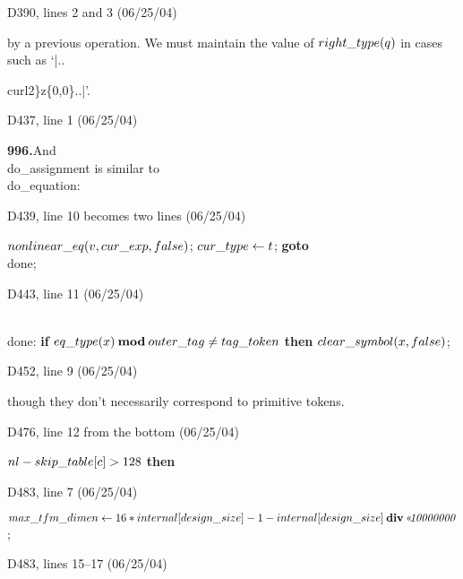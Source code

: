 {{\bugonpage D390, lines 2 and 3 (06/25/04)

\noindent
by a previous operation. We must maintain
the value of $\\{right\_type}(q)$ in cases such as\break
`|..\\{curl2\}z\{0,0\}..|'.

\bugonpage D437, line 1 (06/25/04)

\noindent
{\bf996.\quad}And \\{do\_assignment} is similar to \\{do\_equation}:

\bugonpage D439, line 10 becomes two lines (06/25/04)

\ninepoint\noindent
{} $\\{nonlinear\_eq}(v,\\{cur\_exp},\\{false})$;
  $\\{cur\_type}\gets t$;
  {\bf goto} \\{done};

\bugonpage D443, line 11 (06/25/04)

\ninepoint\noindent
\\{done}: {\bf if\/} $\\{eq\_type}(x)\mathbin{\hbox{\bf mod}}\\{outer\_tag}
  \ne\\{tag\_token}$ {\bf then}
  $\\{clear\_symbol}(x,\\{false})$;

\bugonpage D452, line 9 (06/25/04)

\noindent
though they don't necessarily correspond to primitive tokens.

\bugonpage D476, line 12 from the bottom (06/25/04)

\ninepoint\noindent
{} $\\{nl}-\\{skip\_table}[c]>128$ {\bf then}

\bugonpage D483, line 7 (06/25/04)

\ninepoint\noindent
\quad$\\{max\_tfm\_dimen}\gets16\ast\\{internal}[\\{design\_size}]-1
  -\\{internal}[\\{design\_size}]\mathbin{\hbox{\bf div}}\Oct{10000000}$;

\bugonpage D483, lines 15--17 (06/25/04)

}}}
